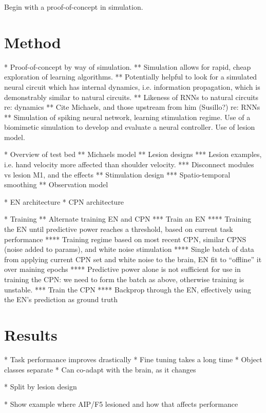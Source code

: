 \documentclass[12pt]{iopart}
\begin{document}
Begin with a proof-of-concept in simulation.

\section{Method}

* Proof-of-concept by way of simulation.
** Simulation allows for rapid, cheap exploration of learning algorithms.
** Potentially helpful to look for a simulated neural circuit which has internal dynamics, i.e. information propagation, which is demonstrably similar to natural circuits.
** \cite{kao.sim} Likeness of RNNs to natural circuits re: dynamics
** Cite Michaels, and those upstream from him (Susillo?) re: RNNs
** \cite{bernal.sim} Simulation of spiking neural network, learning stimulation regime. Use of a biomimetic
  simulation to develop and evaluate a neural controller. Use of lesion model.

* Overview of test bed
** Michaels model \cite{michaels.mrnn}
** Lesion designs
*** Lesion examples, i.e. hand velocity more affected than shoulder velocity.
*** Disconnect modules vs lesion M1, and the effects
** Stimulation design
*** Spatio-temporal smoothing
** Observation model

* EN architecture
* CPN architecture

* Training
** Alternate training EN and CPN
*** Train an EN
**** Training the EN until predictive power reaches a threshold, based on current task performance
**** Training regime based on most recent CPN, similar CPNS (noise added to params), and white noise stimulation
**** Single batch of data from applying current CPN set and white noise to the brain, EN fit to ``offline'' it over maining epochs
**** Predictive power alone is not sufficient for use in training the CPN: we need to form the batch as above, otherwise training is unstable.
*** Train the CPN
**** Backprop through the EN, effectively using the EN's prediction as ground truth

\section{Results}

* Task performance improves drastically
* Fine tuning takes a long time
* Object classes separate
* Can co-adapt with the brain, as it changes

* Split by lesion design

* Show example where AIP/F5 lesioned and how that affects performance
\end{document}

